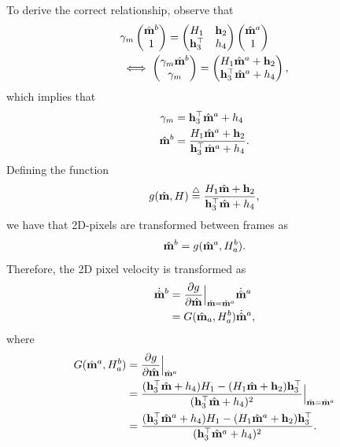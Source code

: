 To derive the correct relationship, observe that
\begin{align*}
& \gamma_m\begin{pmatrix}\hat{\mathbf{m}}^b \\ 1 \end{pmatrix} = \begin{pmatrix} H_1 & \mathbf{h}_2 \\ \mathbf{h}_3^\top & h_4 \end{pmatrix} \begin{pmatrix} \hat{\mathbf{m}}^a \\ 1 \end{pmatrix} \\
&\iff \begin{pmatrix}\gamma_m\hat{\mathbf{m}}^b \\ \gamma_m \end{pmatrix} = \begin{pmatrix} H_1 \hat{\mathbf{m}}^a + \mathbf{h}_2 \\ \mathbf{h}_3^\top\hat{\mathbf{m}}^a + h_4 \end{pmatrix},
\end{align*}
which implies that
\begin{align*}
\gamma_m &= \mathbf{h}_3^\top\hat{\mathbf{m}}^a + h_4 \\
\hat{\mathbf{m}}^b &= \frac{ H_1 \hat{\mathbf{m}}^a + \mathbf{h}_2}{\mathbf{h}_3^\top\hat{\mathbf{m}}^a + h_4}.
\end{align*}
Defining the function
\begin{equation}\label{eq:homography_g}
g(\hat{\mbf}, H) \defeq \frac{H_1\hat{\mbf} + \hbf_2}{\hbf_3^\top \hat{\mbf} + h_4},
\end{equation}
we have that 2D-pixels are transformed between frames as
\[
\hat{\mathbf{m}}^b = g(\hat{\mathbf{m}}^a, H_a^b).
\]
Therefore, the 2D pixel velocity is transformed as
\begin{align}
\dot{\hat{\mbf}}^b &= \frac{\partial g}{\partial \hat{\mbf}}\Big|_{\hat{\mbf}=\hat{\mbf}^a} \dot{\hat{\mbf}}^a \notag \\
&= G(\hat{\mbf}_a, H_a^b)\dot{\hat{\mbf}}^a,
\label{eq:homography_velocity_transform}
\end{align}
where
\begin{align}
G(\hat{\mbf}^a, H_a^b) &= \frac{\partial g}{\partial \hat{\mbf}}\Big|_{\hat{\mbf}^a} \notag \\
&= \frac{(\hbf_3^\top \hat{\mbf} + h_4)H_1 - (H_1\hat{\mbf}+\hbf_2)\hbf_3^\top}{(\hbf_3^\top \hat{\mbf} + h_4)^2}\Big|_{\hat{\mbf}=\hat{\mbf}^a} \notag \\
&=\frac{(\hbf_3^\top \hat{\mbf}^a + h_4)H_1 - (H_1\hat{\mbf}^a+\hbf_2)\hbf_3^\top}{(\hbf_3^\top \hat{\mbf}^a + h_4)^2}.
\label{eq:homography_G}
\end{align}

